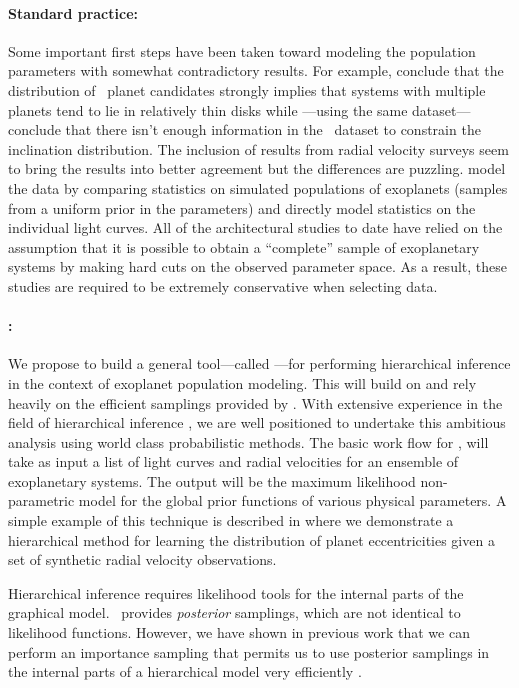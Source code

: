 \documentclass[letterpaper,12pt,preprint]{hack_aastex}
\newcommand{\Bart}{\package{Bart}}
\newcommand{\TheCreator}{\package{TheCreator}}
\begin{document}
\paragraph{Standard practice:}
Some important first steps have been taken toward modeling the population
parameters \citep[for example,][]{lissauer,tremaine,fang} with somewhat
contradictory results.
For example, \citet{fang} conclude that the distribution of \Kepler\ planet
candidates strongly implies that systems with multiple planets tend to lie in
relatively thin disks while \citet{tremaine}---using the same
dataset---conclude that there isn't enough information in the \Kepler\ dataset
to constrain the inclination distribution.
The inclusion of results from radial velocity surveys seem to bring the
results into better agreement but the differences are
puzzling.
\citet{fang} model
the data by comparing statistics on simulated populations of exoplanets
 (samples from a uniform prior in the parameters) and \citet{tremaine}
directly model statistics on the individual light curves.
All of the architectural studies to date have relied on the assumption that it
is possible to obtain a ``complete'' sample of exoplanetary systems by making
hard cuts on the observed parameter space.
As a result, these studies are required to be extremely conservative when
selecting data.


\paragraph{\TheCreator:}
We propose to build a general tool---called \TheCreator---for performing
hierarchical inference in the context of exoplanet population modeling.
This will build on and rely heavily on the efficient samplings provided by
\Bart.
With extensive experience in the field of hierarchical inference
\citep{xd,hogg-ecc,stargal}, we are well positioned to undertake this
ambitious analysis using world class probabilistic methods.
The basic work flow for \TheCreator, will take as input a list of light
curves and radial velocities for an ensemble of exoplanetary systems.
The output will be the maximum likelihood non-parametric model for the global
prior functions of various physical parameters.
A simple example of this technique is described in \citet{hogg-ecc} where we
demonstrate a hierarchical method for learning the distribution of planet
eccentricities given a set of synthetic radial velocity observations.

Hierarchical inference requires likelihood tools for the internal parts
of the graphical model.
\Bart\ provides \emph{posterior} samplings, which
are not identical to likelihood functions.
However, we have shown in previous work that we can perform an importance
sampling that permits us to use posterior samplings in the internal parts
of a hierarchical model very efficiently \citep{hogg-ecc}.
\end{document}
